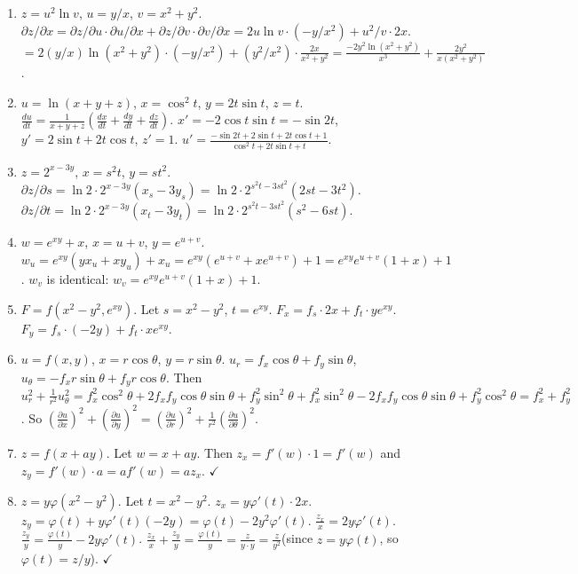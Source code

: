 \documentclass[12pt,a4paper]{article}
\begin{document}
\begin{enumerate}[leftmargin=*, label=(\alph*)]

\item $z=u^2\ln v$, $u=y/x$, $v=x^2+y^2$.
$\partial z/\partial x=\partial z/\partial u\cdot\partial u/\partial x+\partial z/\partial v\cdot\partial v/\partial x=2u\ln v\cdot(-y/x^2)+u^2/v\cdot 2x$.
$=2(y/x)\ln(x^2+y^2)\cdot(-y/x^2)+(y^2/x^2)\cdot\frac{2x}{x^2+y^2}=\frac{-2y^2\ln(x^2+y^2)}{x^3}+\frac{2y^2}{x(x^2+y^2)}$.

\item $u=\ln(x+y+z)$, $x=\cos^2 t$, $y=2t\sin t$, $z=t$.
$\frac{du}{dt}=\frac{1}{x+y+z}\left(\frac{dx}{dt}+\frac{dy}{dt}+\frac{dz}{dt}\right)$.
$x'=-2\cos t\sin t=-\sin 2t$, $y'=2\sin t+2t\cos t$, $z'=1$.
$u'=\frac{-\sin 2t+2\sin t+2t\cos t+1}{\cos^2 t+2t\sin t+t}$.

\item $z=2^{x-3y}$, $x=s^2t$, $y=st^2$.
$\partial z/\partial s=\ln 2\cdot 2^{x-3y}(x_s-3y_s)=\ln 2\cdot 2^{s^2t-3st^2}(2st-3t^2)$.
$\partial z/\partial t=\ln 2\cdot 2^{x-3y}(x_t-3y_t)=\ln 2\cdot 2^{s^2t-3st^2}(s^2-6st)$.

\item $w=e^{xy}+x$, $x=u+v$, $y=e^{u+v}$.
$w_u=e^{xy}(y x_u+x y_u)+x_u=e^{xy}(e^{u+v}+x e^{u+v})+1=e^{xy}e^{u+v}(1+x)+1$.
$w_v$ is identical: $w_v=e^{xy}e^{u+v}(1+x)+1$.

\item $F=f(x^2-y^2,e^{xy})$. Let $s=x^2-y^2$, $t=e^{xy}$.
$F_x=f_s\cdot 2x+f_t\cdot ye^{xy}$.
$F_y=f_s\cdot(-2y)+f_t\cdot xe^{xy}$.

\item $u=f(x,y)$, $x=r\cos\theta$, $y=r\sin\theta$.
$u_r=f_x\cos\theta+f_y\sin\theta$, $u_\theta=-f_x r\sin\theta+f_y r\cos\theta$.
Then $u_r^2+\frac{1}{r^2}u_\theta^2=f_x^2\cos^2\theta+2f_xf_y\cos\theta\sin\theta+f_y^2\sin^2\theta+f_x^2\sin^2\theta-2f_xf_y\cos\theta\sin\theta+f_y^2\cos^2\theta=f_x^2+f_y^2$.
So $\left(\frac{\partial u}{\partial x}\right)^2+\left(\frac{\partial u}{\partial y}\right)^2=\left(\frac{\partial u}{\partial r}\right)^2+\frac{1}{r^2}\left(\frac{\partial u}{\partial \theta}\right)^2$.

\item $z=f(x+ay)$. Let $w=x+ay$. Then $z_x=f'(w)\cdot 1=f'(w)$ and $z_y=f'(w)\cdot a=af'(w)=az_x$. $\checkmark$

\item $z=y\varphi(x^2-y^2)$. Let $t=x^2-y^2$.
$z_x=y\varphi'(t)\cdot 2x$. $z_y=\varphi(t)+y\varphi'(t)(-2y)=\varphi(t)-2y^2\varphi'(t)$.
$\frac{z_x}{x}=2y\varphi'(t)$.
$\frac{z_y}{y}=\frac{\varphi(t)}{y}-2y\varphi'(t)$.
$\frac{z_x}{x}+\frac{z_y}{y}=\frac{\varphi(t)}{y}=\frac{z}{y\cdot y}=\frac{z}{y^2}$\quad (since $z=y\varphi(t)$, so $\varphi(t)=z/y$). $\checkmark$

\end{enumerate}
\end{document}
